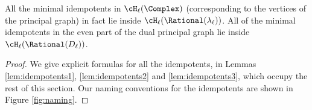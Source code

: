 
\begin{thm}
All the minimal idempotents in $\cH_\ell(\Complex)$ (corresponding to the vertices of the principal graph) in fact lie inside $\cH_\ell(\Rational(\lambda_\ell))$.  All of the minimal idempotents in the even part of the dual principal graph lie inside $\cH_\ell(\Rational(D_\ell))$.
\end{thm}

\begin{proof}
We give explicit formulas for all the idempotents, in Lemmas \ref{lem:idempotents1}, \ref{lem:idempotents2} and \ref{lem:idempotents3}, which occupy the rest of this section. Our naming conventions for the idempotents are shown in Figure \ref{fig:naming}.
\end{proof}
